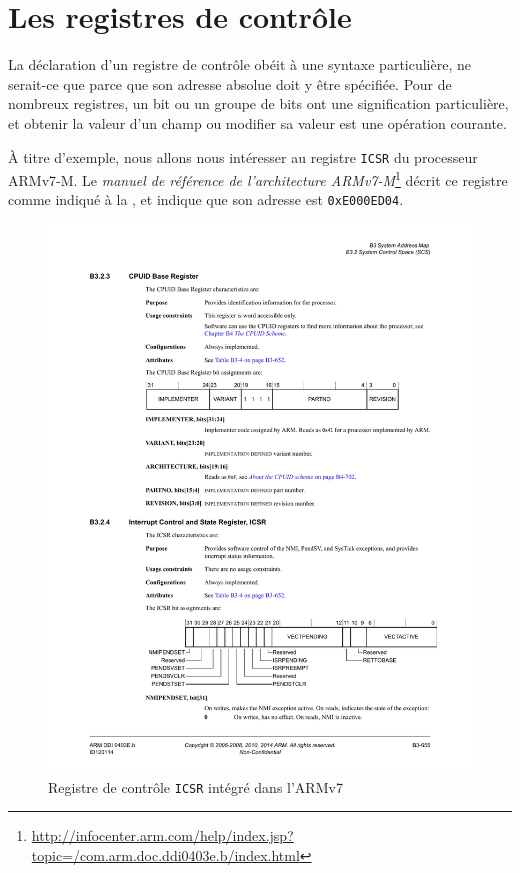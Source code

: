 

\chapter{Les registres de contrôle}

La déclaration d'un registre de contrôle obéit à une syntaxe particulière, ne serait-ce que parce que son adresse absolue doit y être spécifiée. Pour de nombreux registres, un bit ou un groupe de bits ont une signification particulière, et obtenir la valeur d'un champ ou modifier sa valeur est une opération courante.

À titre d'exemple, nous allons nous intéresser au registre \texttt{ICSR} du processeur ARMv7-M. Le \emph{manuel de référence de l'architecture ARMv7-M}\footnote{\url{http://infocenter.arm.com/help/index.jsp?topic=/com.arm.doc.ddi0403e.b/index.html}} décrit ce registre comme indiqué à la , et indique que son adresse est \texttt{0xE000ED04}.

\begin{figure}[t]
\centering
\includegraphics[width=14cm]{chapitres/icsr-armv7m.pdf}
\caption{Registre de contrôle \texttt{ICSR} intégré dans l'ARMv7}
\ligne
\end{figure}





